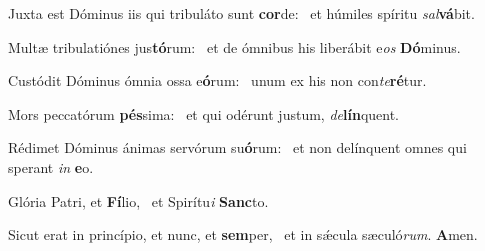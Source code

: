 \item Juxta est Dóminus iis qui tribuláto sunt \textbf{cor}de:~\psstar{} et húmiles spíritu \textit{sal}\textbf{vá}bit.
\item Multæ tribulatiónes jus\textbf{tó}\-rum:~\psstar{} et de ómnibus his liberábit e\textit{os} \textbf{Dó}minus.
\item Custódit Dóminus ómnia ossa e\textbf{ó}rum:~\psstar{} unum ex his non con\textit{te}\textbf{ré}tur.
\item Mors peccatórum \textbf{pés}sima:~\psstar{} et qui odérunt justum, \textit{de}\textbf{lín}quent.
\item Rédimet Dóminus ánimas servórum su\textbf{ó}rum:~\psstar{} et non delínquent omnes qui sperant \textit{in} \textbf{e}o.
\item Glória Patri, et \textbf{Fí}lio,~\psstar{} et Spirítu\textit{i} \textbf{Sanc}to.
\item Sicut erat in princípio, et nunc, et \textbf{sem}per,~\psstar{} et in sǽcula sæculó\textit{rum}. \textbf{A}men.
